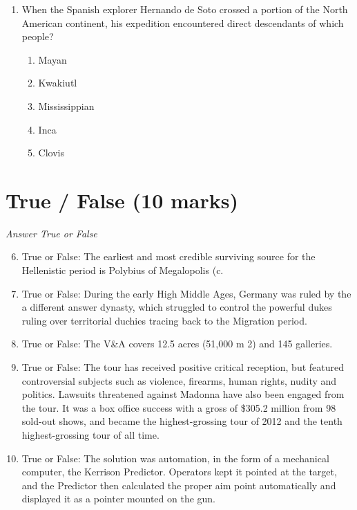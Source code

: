 \documentclass[12pt]{article}
\begin{document}
\begin{enumerate}[label=\arabic*.]
\begin{enumerate}[label=(\alph*)]
    \item meat to fruits and vegetables.
    \item species focused on grasses to fruits and vegetables.
    \item nuts and fruits to fish.
    \item nuts and fruits to species more focused on grasses.
    \item species focused on grasses to meat.
\end{enumerate}
\item When the Spanish explorer Hernando de Soto crossed a portion of the North American continent, his expedition encountered direct descendants of which people?
\begin{enumerate}[label=(\alph*)]
    \item Mayan
    \item Kwakiutl
    \item Mississippian
    \item Inca
    \item Clovis
\end{enumerate}
\end{enumerate}

\section*{True / False (10 marks)}
\textit{Answer True or False}
\begin{enumerate}[label=\arabic*.]
\setcounter{enumi}{5}
\item True or False: The earliest and most credible surviving source for the Hellenistic period is Polybius of Megalopolis (c.
\item True or False: During the early High Middle Ages, Germany was ruled by the a different answer dynasty, which struggled to control the powerful dukes ruling over territorial duchies tracing back to the Migration period.
\item True or False: The V\&A covers 12.5 acres (51,000 m 2) and 145 galleries.
\item True or False: The tour has received positive critical reception, but featured controversial subjects such as violence, firearms, human rights, nudity and politics. Lawsuits threatened against Madonna have also been engaged from the tour. It was a box office success with a gross of \$305.2 million from 98 sold-out shows, and became the highest-grossing tour of 2012 and the tenth highest-grossing tour of all time.
\item True or False: The solution was automation, in the form of a mechanical computer, the Kerrison Predictor. Operators kept it pointed at the target, and the Predictor then calculated the proper aim point automatically and displayed it as a pointer mounted on the gun.
\end{enumerate}
\end{document}
